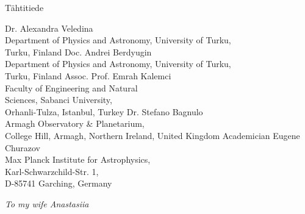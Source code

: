 
%
% 
\iffin
\else
\fi

%
%
\subject{Astronomy}{Tähtitiede}
\imgcovertrue




{Dr. Alexandra Veledina\\Department of Physics and Astronomy, University of Turku, \\Turku, Finland}
{Doc. Andrei Berdyugin\\Department of Physics and Astronomy, University of Turku, \\Turku, Finland}
{Assoc. Prof. Emrah Kalemci\\Faculty of Engineering and Natural \\ Sciences, Sabanci University, \\Orhanli-Tulza, Istanbul, Turkey}
{Dr. Stefano Bagnulo\\Armagh Observatory \& Planetarium, \\College Hill, Armagh, Northern Ireland, United Kingdom}
{Academician Eugene Churazov\\Max Planck Institute for Astrophysics, \\Karl-Schwarzchild-Str. 1, \\D-85741 Garching, Germany}


\thispagestyle{empty}
\vspace*{\fill}
\begin{flushright}

\textit{To my wife Anastasiia}
\end{flushright}
\newpage



